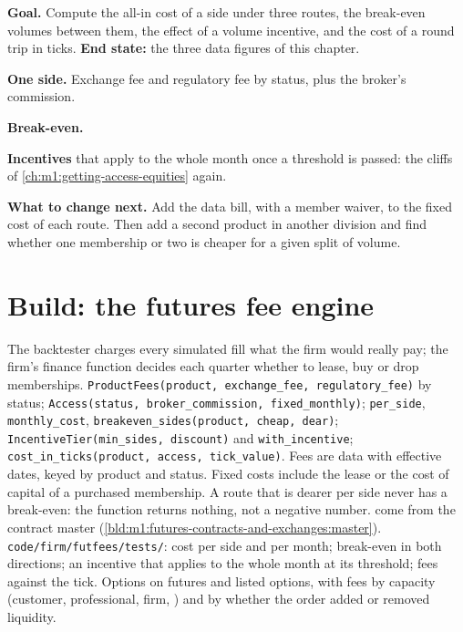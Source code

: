 \begin{tutorial}
\textbf{Goal.} Compute the all-in cost of a side under three routes, the
break-even volumes between them, the effect of a volume incentive, and the
cost of a round trip in ticks. \textbf{End state:} the three data figures of
this chapter.
\begin{tutsteps}
\item \textbf{One side.} Exchange fee and regulatory fee by status, plus the
broker's commission.
\label{lst:m1:getting-access-futures-options:fees}
\item \textbf{Break-even.}
\label{lst:m1:getting-access-futures-options:breakeven}
\item \textbf{Incentives} that apply to the whole month once a threshold is
passed: the cliffs of \cref{ch:m1:getting-access-equities} again.
\end{tutsteps}
\textbf{What to change next.} Add the data bill, with a member waiver, to the
fixed cost of each route. Then add a second product in another division and
find whether one membership or two is cheaper for a given split of volume.
\end{tutorial}

\section{Build: the futures fee engine}\label{bld:m1:getting-access-futures-options:futfees}

\begin{build}
 The backtester charges every simulated fill what the firm
would really pay; the firm's finance function decides each quarter whether to
lease, buy or drop memberships.
 \texttt{ProductFees(product, exchange\_fee, regulatory\_fee)}
by status; \texttt{Access(status, broker\_commission, fixed\_monthly)};
\texttt{per\_side}, \texttt{monthly\_cost}, \texttt{breakeven\_sides(product,
cheap, dear)}; \texttt{IncentiveTier(min\_sides, discount)} and
\texttt{with\_incentive}; \texttt{cost\_in\_ticks(product, access, tick\_value)}.
 Fees are data with effective dates, keyed by product and
status. Fixed costs include the lease or the cost of capital of a purchased
membership. A route that is dearer per side never has a break-even: the
function returns nothing, not a negative number.  come from the
contract master (\cref{bld:m1:futures-contracts-and-exchanges:master}).
 \texttt{code/firm/futfees/tests/}: cost per side
and per month; break-even in both directions; an incentive that applies to
the whole month at its threshold; fees against the tick.
 Options on futures and listed options, with fees by
capacity (customer, professional, firm, ) and by whether the
order added or removed liquidity.
\end{build}

